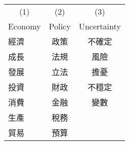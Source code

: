 {
\def\sym#1{\ifmmode^{#1}\else\(^{#1}\)\fi}
\begin{tabular}{l c c}
\hline\hline

\multicolumn{1}{c}{(1)}
&\multicolumn{1}{c}{(2)}
&\multicolumn{1}{c}{(3)}
\\

\multicolumn{1}{c}{Economy}
&\multicolumn{1}{c}{Policy}
&\multicolumn{1}{c}{Uncertainty}
\\
\hline
經濟              & 政策             & 不確定                  \\
成長               & 法規             & 風險                    \\
發展              & 立法             & 擔憂                    \\
投資               & 財政             & 不穩定                  \\
消費              & 金融             & 變數                    \\
生產              & 稅務             &                         \\
貿易              & 預算             &                         \\
\hline\hline
\end{tabular}
}
